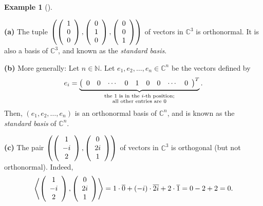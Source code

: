 \documentclass[numbers=enddot,12pt,final,onecolumn,notitlepage]{scrartcl}%
\numberwithin{exer}{subsection}
\theoremstyle{definition}
\newtheorem{exam}[theo]{Example}
\newenvironment{example}[1][]
{\begin{exam}[#1]\begin{leftbar}}
{\end{leftbar}\end{exam}}
\begin{document}
\begin{example}
\textbf{(a)} The tuple $\left(  \left(
\begin{array}
[c]{c}%
1\\
0\\
0
\end{array}
\right)  ,\left(
\begin{array}
[c]{c}%
0\\
1\\
0
\end{array}
\right)  ,\left(
\begin{array}
[c]{c}%
0\\
0\\
1
\end{array}
\right)  \right)  $ of vectors in $\mathbb{C}^{3}$ is orthonormal. It is also
a basis of $\mathbb{C}^{3}$, and known as the \emph{standard basis}. \medskip

\textbf{(b)} More generally: Let $n\in\mathbb{N}$. Let $e_{1},e_{2}%
,\ldots,e_{n}\in\mathbb{C}^{n}$ be the vectors defined by%
\[
e_{i}=\underbrace{\left(
\begin{array}
[c]{ccccccccc}%
0 & 0 & \cdots & 0 & 1 & 0 & 0 & \cdots & 0
\end{array}
\right)  ^{T}}_{\substack{\text{the }1\text{ is in the }i\text{-th
position;}\\\text{all other entries are }0}}.
\]
Then, $\left(  e_{1},e_{2},\ldots,e_{n}\right)  $ is an orthonormal basis of
$\mathbb{C}^{n}$, and is known as the \emph{standard basis} of $\mathbb{C}%
^{n}$. \medskip

\textbf{(c)} The pair $\left(  \left(
\begin{array}
[c]{c}%
1\\
-i\\
2
\end{array}
\right)  ,\left(
\begin{array}
[c]{c}%
0\\
2i\\
1
\end{array}
\right)  \right)  $ of vectors in $\mathbb{C}^{3}$ is orthogonal (but not
orthonormal). Indeed,%
\[
\left\langle \left(
\begin{array}
[c]{c}%
1\\
-i\\
2
\end{array}
\right)  ,\left(
\begin{array}
[c]{c}%
0\\
2i\\
1
\end{array}
\right)  \right\rangle =1\cdot\overline{0}+\left(  -i\right)  \cdot
\overline{2i}+2\cdot\overline{1}=0-2+2=0.
\]



\end{example}
\end{document}
